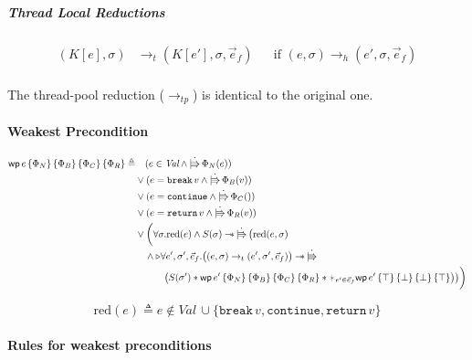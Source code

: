 \documentclass{article}
\numberwithin{algorithm}{section}
\newcommand{\progspec}[1]{\{ #1 \}}
\newcommand{\cbreak}{\texttt{break}\,}
\newcommand{\ccontinue}{\texttt{continue}}
\newcommand{\creturn}{\texttt{return}\,}
\newcommand{\hred}{\rightarrow_h}
\newcommand{\tred}{\rightarrow_t}
\newcommand{\tpred}{\rightarrow_{tp}}
\newcommand{\cred}{\text{red}}
\newcommand{\wand}{-\mkern-8mu*\,}
\newcommand{\upd}{\dot{|\mkern-8mu\Rrightarrow}\,}
\newcommand{\later}{\triangleright}
\newcommand{\wpre}[5]{\textsf{wp}\, #1\, \progspec{#2}\, \progspec{#3}\, \progspec{#4}\, \progspec{#5}}
\begin{document}
\subparagraph{Thread Local Reductions}

$$
\begin{aligned}
    (K[e], \sigma) &\tred (K[e'], \sigma, \vec{e}_f) && \text{if } (e, \sigma) \hred (e', \sigma, \vec{e}_f) \\
\end{aligned}
$$

The thread-pool reduction ($\tpred$) is identical to the original one.


\paragraph{Weakest Precondition}

$$
\begin{aligned}
    \wpre{e}{\Phi_N}{\Phi_B}{\Phi_C}{\Phi_R} \triangleq& \quad
           (e \in \textit{Val} \land \upd \Phi_N(e)) \\
    & \lor (e = \cbreak v \land \upd \Phi_B(v)) \\
    & \lor (e = \ccontinue \land \upd \Phi_C()) \\
    & \lor (e = \creturn v \land \upd \Phi_R(v)) \\
    & \lor \biggl(\forall \sigma. \cred(e) \land S(\sigma) \wand \upd \bigl(\cred(e, \sigma) \\
    & \quad \land \later
        \forall e', \sigma', \vec{e}_f. \bigl((e, \sigma) \tred (e', \sigma', \vec{e}_f)\bigr) \wand \upd \\
    & \quad\quad\quad \bigl(S(\sigma') * \wpre{e'}{\Phi_N}{\Phi_B}{\Phi_C}{\Phi_R} * \varhexstar_{e'\in\vec{e}_f} \wpre{e'}{\top}{\bot}{\bot}{\top} \bigr)\bigr)\biggr)
\end{aligned}
$$

$$
\cred(e) \triangleq e \notin \textit{Val}\, \cup \{\cbreak v, \ccontinue, \creturn v\}
$$


\paragraph{Rules for weakest preconditions}
\end{document}
